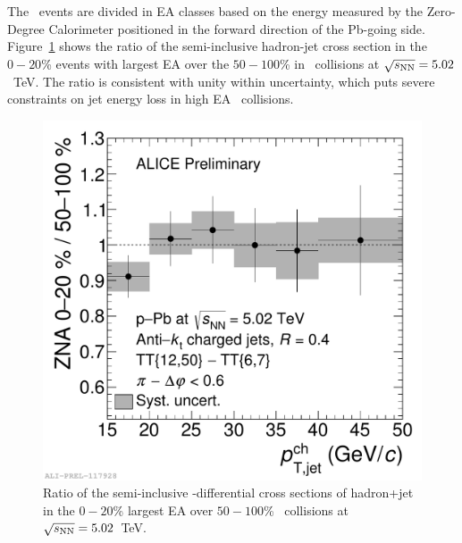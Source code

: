 \documentclass[10pt]{article}
\begin{document}
The \pPb\ events are divided in EA classes based on the energy measured by the Zero-Degree Calorimeter positioned in the forward direction of the Pb-going side.
Figure~\ref{fig:rppbhjet} shows the ratio of the semi-inclusive hadron-jet cross section in the $0-20$\% events with largest EA over the $50-100$\%
in \pPb\ collisions at $\sqrt{s_{\rm NN}}=5.02$~TeV.
The ratio is consistent with unity within uncertainty, which puts severe constraints on jet energy loss in high EA \pPb\ collisions.
\begin{figure}[tb]
\centering
\includegraphics[width=.5\textwidth]{img/2017-Feb-01-ppb5_RCP_pap_AKT04_ZNA_split2}
\caption{Ratio of the semi-inclusive \pt-differential cross sections of hadron+jet in the $0-20$\% largest EA over $50-100$\% \pPb\ collisions at $\sqrt{s_{\rm NN}}=5.02$~TeV.}
\label{fig:rppbhjet}
\end{figure}
\end{document}
